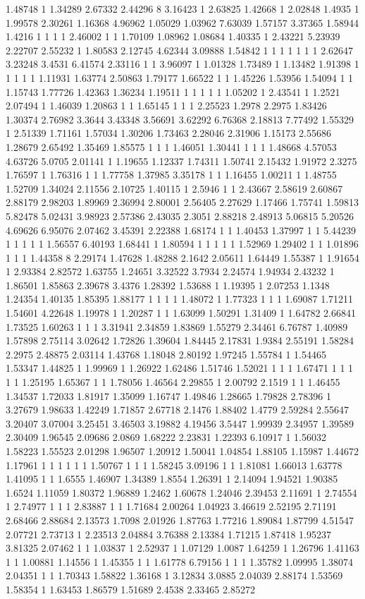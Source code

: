 1.48748 1 1.34289 2.67332 2.44296 8 3.16423 1 2.63825 1.42668 1 2.02848 1.4935 1 1.99578 2.30261 1.16368 4.96962 1.05029 1.03962 7.63039 1.57157 3.37365 1.58944 1.4216 1 1 1 1 2.46002 1 1 1.70109 1.08962 1.08684 1.40335 1 2.43221 5.23939 2.22707 2.55232 1 1.80583 2.12745 4.62344 3.09888 1.54842 1 1 1 1 1 1 1 2.62647 3.23248 3.4531 6.41574 2.33116 1 1 3.96097 1 1.01328 1.73489 1 1.13482 1.91398 1 1 1 1 1 1.11931 1.63774 2.50863 1.79177 1.66522 1 1 1.45226 1.53956 1.54094 1 1 1.15743 1.77726 1.42363 1.36234 1.19511 1 1 1 1 1 1.05202 1 2.43541 1 1.2521 2.07494 1 1.46039 1.20863 1 1 1.65145 1 1 1 2.25523 1.2978 2.2975 1.83426 1.30374 2.76982 3.3644 3.43348 3.56691 3.62292 6.76368 2.18813 7.77492 1.55329 1 2.51339 1.71161 1.57034 1.30206 1.73463 2.28046 2.31906 1.15173 2.55686 1.28679 2.65492 1.35469 1.85575 1 1 1 1.46051 1.30441 1 1 1 1.48668 4.57053 4.63726 5.0705 2.01141 1 1.19655 1.12337 1.74311 1.50741 2.15432 1.91972 2.3275 1.76597 1 1.76316 1 1 1.77758 1.37985 3.35178 1 1 1.16455 1.00211 1 1.48755 1.52709 1.34024 2.11556 2.10725 1.40115 1 2.5946 1 1 2.43667 2.58619 2.60867 2.88179 2.98203 1.89969 2.36994 2.80001 2.56405 2.27629 1.17466 1.75741 1.59813 5.82478 5.02431 3.98923 2.57386 2.43035 2.3051 2.88218 2.48913 5.06815 5.20526 4.69626 6.95076 2.07462 3.45391 2.22388 1.68174 1 1 1.40453 1.37997 1 1 5.44239 1 1 1 1 1 1.56557 6.40193 1.68441 1 1.80594 1 1 1 1 1 1.52969 1.29402 1 1 1.01896 1 1 1 1.44358 8 2.29174 1.47628 1.48288 2.1642 2.05611 1.64449 1.55387 1 1.91654 1 2.93384 2.82572 1.63755 1.24651 3.32522 3.7934 2.24574 1.94934 2.43232 1 1.86501 1.85863 2.39678 3.4376 1.28392 1.53688 1 1.19395 1 2.07253 1.1348 1.24354 1.40135 1.85395 1.88177 1 1 1 1 1.48072 1 1.77323 1 1 1 1.69087 1.71211 1.54601 4.22648 1.19978 1 1.20287 1 1 1.63099 1.50291 1.31409 1 1.64782 2.66841 1.73525 1.60263 1 1 1 3.31941 2.34859 1.83869 1.55279 2.34461 6.76787 1.40989 1.57898 2.75114 3.02642 1.72826 1.39604 1.84445 2.17831 1.9384 2.55191 1.58284 2.2975 2.48875 2.03114 1.43768 1.18048 2.80192 1.97245 1.55784 1 1.54465 1.53347 1.44825 1 1.99969 1 1.26922 1.62486 1.51746 1.52021 1 1 1 1.67471 1 1 1 1 1 1.25195 1.65367 1 1 1.78056 1.46564 2.29855 1 2.00792 2.1519 1 1 1.46455 1.34537 1.72033 1.81917 1.35099 1.16747 1.49846 1.28665 1.79828 2.78396 1 3.27679 1.98633 1.42249 1.71857 2.67718 2.1476 1.88402 1.4779 2.59284 2.55647 3.20407 3.07004 3.25451 3.46503 3.19882 4.19456 3.5447 1.99939 2.34957 1.39589 2.30409 1.96545 2.09686 2.0869 1.68222 2.23831 1.22393 6.10917 1 1.56032 1.58223 1.55523 2.01298 1.96507 1.20912 1.50041 1.04854 1.88105 1.15987 1.44672 1.17961 1 1 1 1 1 1 1.50767 1 1 1 1.58245 3.09196 1 1 1.81081 1.66013 1.63778 1.41095 1 1 1.6555 1.46907 1.34389 1.8554 1.26391 1 2.14094 1.94521 1.90385 1.6524 1.11059 1.80372 1.96889 1.2462 1.60678 1.24046 2.39453 2.11691 1 2.74554 1 2.74977 1 1 1 2.83887 1 1 1.71684 2.00264 1.04923 3.46619 2.52195 2.71191 2.68466 2.88684 2.13573 1.7098 2.01926 1.87763 1.77216 1.89084 1.87799 4.51547 2.07721 2.73713 1 2.23513 2.04884 3.76388 2.13384 1.71215 1.87418 1.95237 3.81325 2.07462 1 1 1.03837 1 2.52937 1 1.07129 1.0087 1.64259 1 1.26796 1.41163 1 1 1.00881 1.14556 1 1.45355 1 1 1.61778 6.79156 1 1 1 1.35782 1.09995 1.38074 2.04351 1 1 1.70343 1.58822 1.36168 1 3.12834 3.0885 2.04039 2.88174 1.53569 1.58354 1 1.63453 1.86579 1.51689 2.4538 2.33465 2.85272 